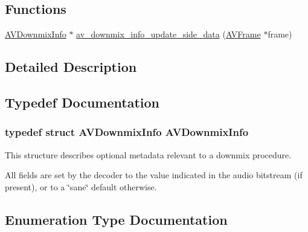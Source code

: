 \subsection*{Functions}
\begin{DoxyCompactItemize}
\item 
\hyperlink{struct_a_v_downmix_info}{A\+V\+Downmix\+Info} $\ast$ \hyperlink{group__downmix__info_gadedd619e3fd3bb7732b917bfafba97a8}{av\+\_\+downmix\+\_\+info\+\_\+update\+\_\+side\+\_\+data} (\hyperlink{struct_a_v_frame}{A\+V\+Frame} $\ast$frame)
\end{DoxyCompactItemize}


\subsection{Detailed Description}


\subsection{Typedef Documentation}
\subsubsection[{\texorpdfstring{A\+V\+Downmix\+Info}{AVDownmixInfo}}]{\setlength{\rightskip}{0pt plus 5cm}typedef struct {\bf A\+V\+Downmix\+Info}  {\bf A\+V\+Downmix\+Info}}\hypertarget{group__downmix__info_gab59cbb1e2ec3e26184533e5f67a89128}{}\label{group__downmix__info_gab59cbb1e2ec3e26184533e5f67a89128}
This structure describes optional metadata relevant to a downmix procedure.

All fields are set by the decoder to the value indicated in the audio bitstream (if present), or to a \char`\"{}sane\char`\"{} default otherwise. 

\subsection{Enumeration Type Documentation}
